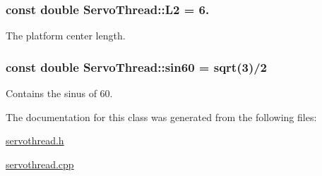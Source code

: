 \hypertarget{a00007_a3d51c16b1f498b48a6ecbfaadaba6ed2}{}
\subsubsection[{L2}]{\setlength{\rightskip}{0pt plus 5cm}const double Servo\+Thread\+::\+L2 = 6.\hspace{0.3cm}{\ttfamily [private]}}\label{a00007_a3d51c16b1f498b48a6ecbfaadaba6ed2}


The platform center length. 

\hypertarget{a00007_aaa3e2dd194949b12f8a41ebd0d62fde9}{}
\subsubsection[{sin60}]{\setlength{\rightskip}{0pt plus 5cm}const double Servo\+Thread\+::sin60 = sqrt(3)/2\hspace{0.3cm}{\ttfamily [private]}}\label{a00007_aaa3e2dd194949b12f8a41ebd0d62fde9}


Contains the sinus of 60. 



The documentation for this class was generated from the following files\+:\begin{DoxyCompactItemize}
\item 
\hyperlink{a00020}{servothread.\+h}\item 
\hyperlink{a00019}{servothread.\+cpp}\end{DoxyCompactItemize}
